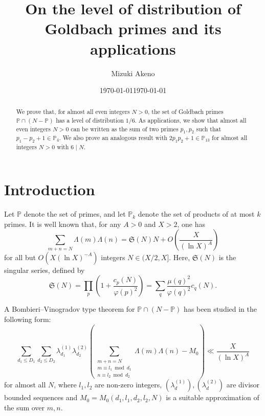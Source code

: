 \documentclass{amsart}
\title{On the level of distribution of Goldbach primes and its applications}
\author{Mizuki Akeno}
\date{\today}
\date{\today}
\theoremstyle{definition}
\theoremstyle{remark}
\newcommand{\1}{
    \bm{1}
}
\begin{document}
\begin{abstract}

We prove that, for almost all even integers $N>0$, the set of Goldbach primes $\mathbb{P} \cap (N-\mathbb{P})$ has a level of distribution $1/6$. 
As applications, we show that almost all even integers $N>0$ can be written as the sum of two primes $p_1, p_2$ such that $p_1-p_2+1 \in \mathbb{P}_4$.
We also prove an analogous result with $2p_1 p_2+1 \in \mathbb{P}_{13}$ for almost all integers \(N>0\) with \(6\mid N\). 
\end{abstract}


\maketitle















\section{Introduction}


Let $\mathbb{P}$ denote the set of primes, and let $\mathbb{P}_k$ denote the set of products of at most $k$ primes. 
It is well known that, for any $A>0$ and $X>2$, one has
\[ \sum_{m+n=N} \Lambda(m) \Lambda(n) = \mathfrak{S}(N) N + O\left( \frac{X}{(\ln{X})^A} \right) \]
for all but $O(X(\ln{X})^{-A})$ integers $N \in (X/2,X]$. Here, $\mathfrak{S}(N)$ is the singular series, defined by
\[ \mathfrak{S}(N) = \prod_{p} \left(1 + \frac{c_p(N)}{\varphi(p)^2} \right) = \sum_{q} \frac{\mu(q)^2}{\varphi(q)^2} c_q(N). \]


A Bombieri--Vinogradov type theorem for $\mathbb{P} \cap (N-\mathbb{P})$ has been studied in the following form:
\begin{equation} \sum_{d_1 \leq D_1} \sum_{d_2 \leq D_2} \lambda^{(1)}_{d_1} \lambda^{(2)}_{d_2} \left( \sum_{\substack{m+n=N \\ m \equiv l_1 \bmod d_1 \\ n \equiv l_2 \bmod d_2}} \Lambda(m) \Lambda(n) - M_0 \right) \ll \frac{X}{(\ln{X})^A} \label{BV1} \end{equation}
for almost all $N$, where $l_1, l_2$ are non-zero integers, $(\lambda^{(1)}_d),(\lambda^{(2)}_d)$ are divisor bounded sequences and $M_0=M_0(d_1,l_1,d_2,l_2,N)$ is a suitable approximation of the sum over $m,n$. 
\end{document}
